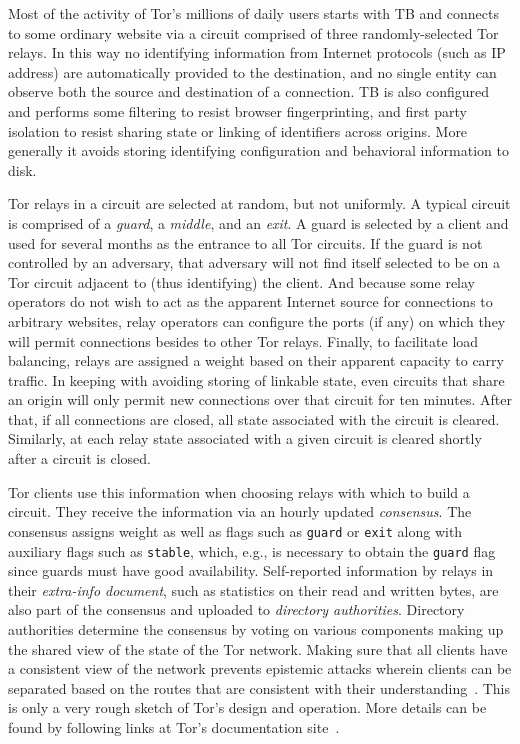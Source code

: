 Most of the activity of Tor's millions of daily users starts with TB
and connects to some ordinary website via a circuit comprised of three
randomly-selected Tor relays. In this way no identifying information from
Internet protocols (such as IP address) are automatically provided to the
destination, and no single entity can observe both the source and destination of
a connection. TB is also configured and performs some filtering to resist
browser fingerprinting, and first party isolation to resist sharing state or
linking of identifiers across origins. More generally it avoids storing
identifying configuration and behavioral information to disk.

Tor relays in a circuit are selected at random, but not uniformly. A typical
circuit is comprised of a \emph{guard}, a \emph{middle}, and an \emph{exit}. A
guard is selected by a client and used for several months as the entrance to all
Tor circuits. If the guard is not controlled by an adversary, that adversary
will not find itself selected to be on a Tor circuit adjacent to (thus
identifying) the client. And because some relay operators do not wish to act as
the apparent Internet source for connections to arbitrary websites, relay
operators can configure the ports (if any) on which they will permit connections
besides to other Tor relays. Finally, to facilitate load balancing, relays are
assigned a weight based on their apparent capacity to carry traffic. In keeping
with avoiding storing of linkable state, even circuits that share an origin will
only permit new connections over that circuit for ten minutes. After that, if
all connections are closed, all state associated with the circuit is cleared.
Similarly, at each relay state associated with a given circuit is cleared
shortly after a circuit is closed.

Tor clients use this information when choosing relays with which to build a
circuit. They receive the information via an hourly updated \emph{consensus}.
The consensus assigns weight as well as flags such as \texttt{guard} or
\texttt{exit} along with auxiliary flags such as \texttt{stable}, which, e.g.,
is necessary to obtain the \texttt{guard} flag since guards must have good
availability. Self-reported information by relays in their \emph{extra-info
document}, such as statistics on their read and written bytes, are also part of
the consensus and uploaded to \emph{directory authorities}. Directory
authorities determine the consensus by voting on various components making up
the shared view of the state of the Tor network. Making sure that all clients
have a consistent view of the network prevents epistemic attacks wherein clients
can be separated based on the routes that are consistent with their
understanding~\cite{danezis:pets2008}. This is only a very rough sketch of Tor's
design and operation.  More details can be found by following links at Tor's
documentation site~\cite{tor-documentation}.

